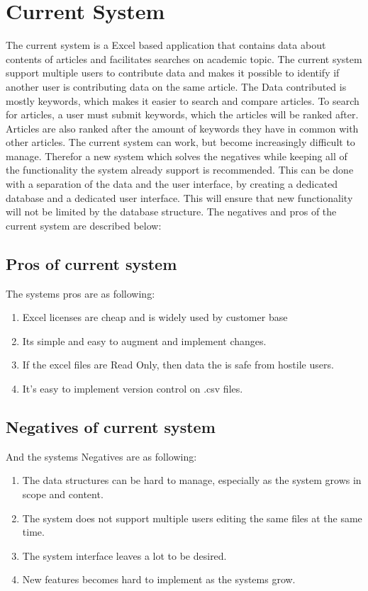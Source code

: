 \section{Current System}

The current system is a Excel based application that contains data about contents of articles and facilitates searches on academic topic. 
The current system support multiple users to contribute data and makes it possible to identify if another user is contributing data on the same article. The Data contributed is mostly keywords, which makes it easier to search and compare articles. To search for articles, a user must submit keywords, which the articles will be ranked after. Articles are also ranked after the amount of keywords they have in common with other articles. The current system can work, but become increasingly difficult to manage. Therefor a new system which solves the negatives while keeping all of the functionality the system already support is recommended. This can be done with a separation of the data and the user interface, by creating a dedicated database and a dedicated user interface. This will ensure that new functionality will not be limited by the database structure. The negatives and pros of the current system are described below:


\subsection{Pros of current system}
The systems pros are as following:

\begin{enumerate}
	\item Excel licenses are cheap and is widely used by customer base
	\item Its simple and easy to augment and implement changes.
	\item If the excel files are Read Only, then data the is safe from hostile users.
	\item It's easy to implement version control on .csv files. 
\end{enumerate}

\subsection{Negatives of current system} 
And the systems Negatives are as following: 

\begin{enumerate}
	\item The data structures can be hard to manage, especially as the system grows in scope and content.
	\item The system does not support multiple users editing the same files at the same time.
	\item The system interface leaves a lot to be desired.
	\item New features becomes hard to implement as the systems grow.
\end{enumerate}
